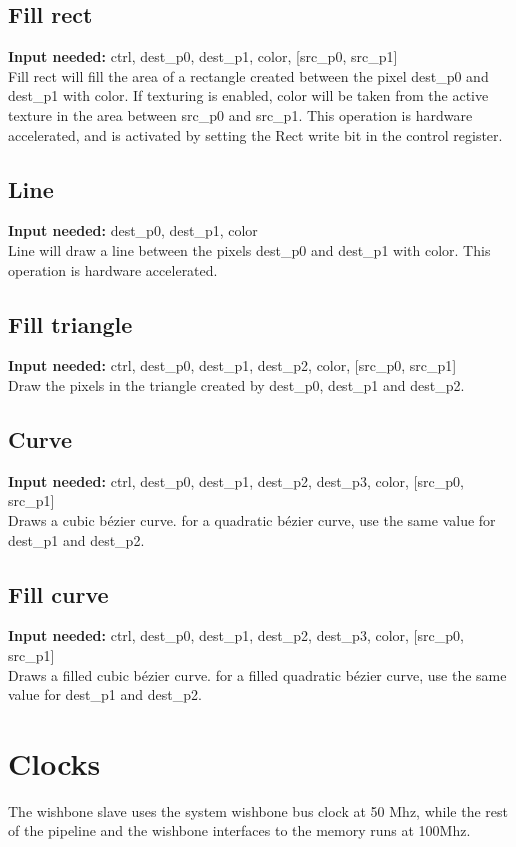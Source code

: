\documentclass[10pt,a4paper]{article}
\begin{document}
\subsection{Fill rect}
\textbf{Input needed:} ctrl, dest\_p0, dest\_p1, color, [src\_p0, src\_p1]\\
Fill rect will fill the area of a rectangle created between the pixel dest\_p0 and  dest\_p1 with color. If texturing is enabled, color will be taken from the active texture in the area between src\_p0 and src\_p1. This operation is hardware accelerated, and is activated by setting the Rect write bit in the control register.

\subsection{Line}
\textbf{Input needed:} dest\_p0, dest\_p1, color\\
Line will draw a line between the pixels dest\_p0 and dest\_p1 with color. This operation is hardware accelerated.

\subsection{Fill triangle}
\textbf{Input needed:} ctrl, dest\_p0, dest\_p1, dest\_p2, color, [src\_p0, src\_p1]\\
Draw the pixels in the triangle created by dest\_p0, dest\_p1 and dest\_p2.

\subsection{Curve}
\textbf{Input needed:} ctrl, dest\_p0, dest\_p1, dest\_p2, dest\_p3, color, [src\_p0, src\_p1]\\
Draws a cubic b\'{e}zier curve. for a quadratic b\'{e}zier curve, use the same value for dest\_p1 and dest\_p2.

\subsection{Fill curve}
\textbf{Input needed:} ctrl, dest\_p0, dest\_p1, dest\_p2, dest\_p3, color, [src\_p0, src\_p1]\\
Draws a filled cubic b\'{e}zier curve. for a filled quadratic b\'{e}zier curve, use the same value for dest\_p1 and dest\_p2.

\section{Clocks}
The wishbone slave uses the system wishbone bus clock at 50 Mhz, while the rest of the pipeline and the wishbone interfaces to the memory runs at 100Mhz.
\end{document}
